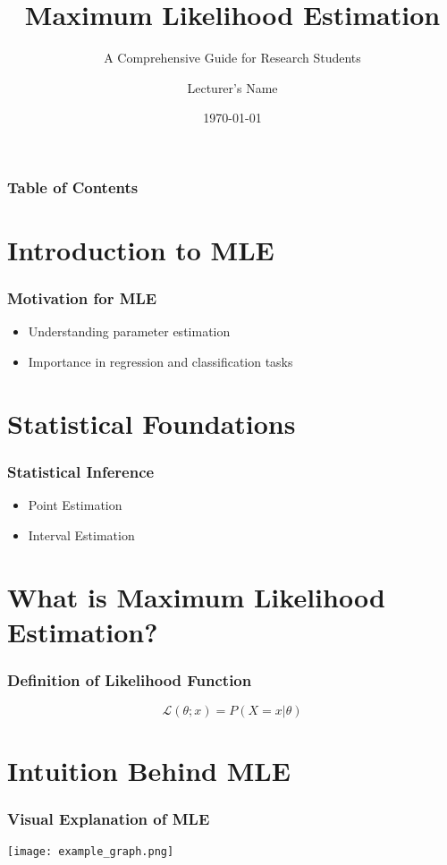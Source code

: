 \documentclass{beamer}
\title{Maximum Likelihood Estimation}
\subtitle{A Comprehensive Guide for Research Students}
\author{Lecturer's Name}
\date{\today}
\begin{document}
\frame{\titlepage}

\begin{frame}
\frametitle{Table of Contents}
\tableofcontents
\end{frame}

\section{Introduction to MLE}
\begin{frame}
\frametitle{Motivation for MLE}
\begin{itemize}
    \item Understanding parameter estimation
    \item Importance in regression and classification tasks
\end{itemize}
\end{frame}

\section{Statistical Foundations}
\begin{frame}
\frametitle{Statistical Inference}
\begin{itemize}
    \item Point Estimation
    \item Interval Estimation
\end{itemize}
\end{frame}

\section{What is Maximum Likelihood Estimation?}
\begin{frame}
\frametitle{Definition of Likelihood Function}
\begin{equation}
\mathcal{L}(\theta; x) = P(X = x | \theta)
\end{equation}
\end{frame}

\section{Intuition Behind MLE}
\begin{frame}
\frametitle{Visual Explanation of MLE}
\begin{center}
    \texttt{[image: example\_graph.png]} %
\end{center}
\end{frame}
\end{document}
